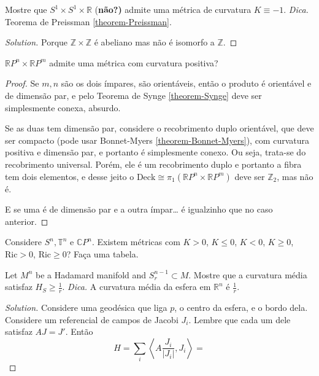 \begin{exercise}
\label{exercise-S1xS1xR-admite-curvatura--1}
Mostre que $S^1 \times S^1 \times \mathbb{R}$ {(\bf não?)} admite uma métrica de
 curvatura $K\equiv-1$. {\it Dica.} Teorema de Preissman 
\ref{theorem-Preissman}.
\end{exercise}

\begin{proof}[Solution]
Porque $\mathbb{Z} \times \mathbb{Z}$ é abeliano mas não é isomorfo a
$\mathbb{Z}$.
\end{proof}

\begin{exercise}
\label{exercise-RPnxRPm-admite-curvatura-positiva}
$\mathbb{R}P^{n}\times \mathbb{R}P^{m}$ admite uma métrica com 
curvatura positiva?
\end{exercise}

\begin{proof}
Se $m,n$ são os dois ímpares, são orientáveis, então o produto é orientável e de
dimensão par, e pelo Teorema de Synge \ref{theorem-Synge} deve ser
simplesmente conexa, absurdo.
 
Se as duas tem dimensão par, considere o recobrimento duplo orientável, que deve
ser compacto (pode usar Bonnet-Myers \ref{theorem-Bonnet-Myers}), com curvatura
positiva e dimensão par, e portanto é simplesmente conexo. Ou seja, trata-se do
recobrimento universal. Porém, ele é um recobrimento duplo e portanto a fibra
tem dois elementos, e desse jeito o $\text{Deck}\cong
\pi_{1}(\mathbb{R}P^{n}\times\mathbb{R}P^{m})$ deve ser $\mathbb{Z}_2$, 
mas não é.

E se uma é de dimensão par e a outra ímpar… é igualzinho que no caso anterior.
\end{proof}

\begin{exercise}
\label{exercise-Sn-Tn-CPn-existem-curvaturas}
Considere $S^n,\mathbb{T}^n$ e $\mathbb{C}P^{n}$. Existem métricas com $K>0$, $K
\leq 0$, $K<0$, $K \geq 0$, $\text{Ric}>0$, $\text{Ric} \geq 0$? Faça uma
tabela.
\end{exercise}

\begin{exercise}
\label{exercise-Hadamard-manifold-sphere}
Let $M^n$ be a Hadamard manifold and $S^{n-1}_r \subset M$. Mostre que
 a curvatura média satisfaz $H_S\geq \frac{1}{r}$. {\it Dica.} A curvatura média
da esfera em $\mathbb{R}^n$ é $\frac{1}{r}$.
\end{exercise}

\begin{proof}[Solution]
Considere uma geodésica que liga $p$, o centro da esfera, e o bordo dela.
Considere um referencial de campos de Jacobi $J_i$. Lembre que cada um dele
satisfaz $A J=J'$. Então
$$
H=\sum_{i}\left<A \frac{J_i}{|J_i|},J_i\right>=
$$
\end{proof}

